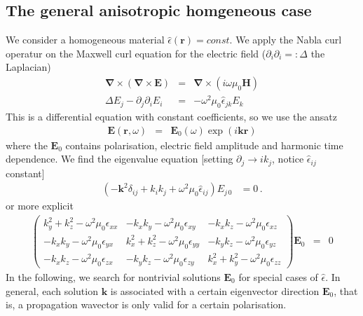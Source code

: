 \documentclass[12pt,a4paper,twoside,openright,BCOR10mm,headsepline,titlepage,abstracton,chapterprefix,final]{scrreprt}
\newcommand\Vector[1]{{\mathbf{#1}}}
\newcommand\vacuum{0}
\newcommand\Location{\Vector{r}}
\newcommand\wavenumber{k}
\newcommand\Wavevector{\Vector{\wavenumber}}
\newcommand\Nabla{\Vector{\nabla}}
\newcommand\Tensor[1]{\hat{#1}}
\newcommand\scalarEfield{E}
\newcommand\scalarHfield{H}
\newcommand\Efield{\Vector{\scalarEfield}}
\newcommand\Hfield{\Vector{\scalarHfield}}
\newcommand\vacuumpermeability{\mu_{\vacuum}}
\newcommand\permittivity{\Tensor{\epsilon}}
\newcommand\scalarpermittivity{\epsilon}
\begin{document}
\subsection{The general anisotropic homgeneous case}
We consider a homogeneous material $\permittivity(\Location) = const.$ We apply the Nabla curl operatur on the Maxwell curl equation for the electric field
($\partial_i \partial_i =: \Delta$ the Laplacian)
\begin{eqnarray}
  \Nabla \times ( \Nabla \times \Efield ) &=& \Nabla \times ( i \omega \vacuumpermeability \Hfield ) 
  \\
  \Delta \scalarEfield_j - \partial_j \partial_i \scalarEfield_i &=& - \omega^2 \vacuumpermeability \permittivity_{jk} \scalarEfield_{k}
\end{eqnarray}
This is a differential equation with constant coefficients, so we use the ansatz
\begin{eqnarray}
 \Efield(\Location,\omega) &=& \Efield_0(\omega) \exp(i \Wavevector \Location)
\end{eqnarray}
where the $\Efield_0$ contains polarisation, electric field amplitude and harmonic time dependence. We find the eigenvalue equation [setting $\partial_j \to i k_j$, notice $\permittivity_{ij}$ constant]
\begin{align}
 \left(-\Vector{k}^2 \delta_{ij} + k_i k_j + \omega^2 \mu_0 \permittivity_{ij} \right) E_{j\,0} &= 0 \,.
\end{align}
or more explicit
\begin{eqnarray}
\begin{pmatrix}
 \wavenumber_y^2 + \wavenumber_z^2 - \omega^2 \vacuumpermeability \scalarpermittivity_{xx} 
 &
 - \wavenumber_x \wavenumber_y - \omega^2 \vacuumpermeability \scalarpermittivity_{xy}
 &
 - \wavenumber_x \wavenumber_z - \omega^2 \vacuumpermeability \scalarpermittivity_{xz}
 \\
 - \wavenumber_x \wavenumber_y - \omega^2 \vacuumpermeability \scalarpermittivity_{yx}
 &
 \wavenumber_x^2 + \wavenumber_z^2 - \omega^2 \vacuumpermeability \scalarpermittivity_{yy} 
 &
 - \wavenumber_y \wavenumber_z - \omega^2 \vacuumpermeability \scalarpermittivity_{yz}
 \\
 - \wavenumber_x \wavenumber_z - \omega^2 \vacuumpermeability \scalarpermittivity_{zx}
 &
 - \wavenumber_y \wavenumber_z - \omega^2 \vacuumpermeability \scalarpermittivity_{zy}
 &
 \wavenumber_x^2 + \wavenumber_y^2 - \omega^2 \vacuumpermeability \scalarpermittivity_{zz}  
\end{pmatrix}
\Efield_0
&=& 0 \label{eq:generalDispersionEigenEquation}
\end{eqnarray}
In the following, we search for nontrivial solutions $\Efield_0$ for special cases of $\permittivity$.
In general, each solution $\Wavevector$ is associated with a certain eigenvector direction $\Efield_0$,
that is, a propagation wavector is only valid for a certain polarisation.
\end{document}
